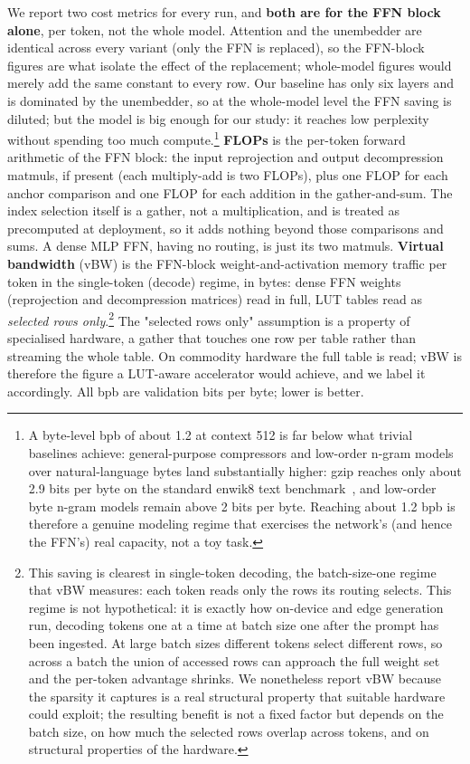 \documentclass[11pt]{article}
\begin{document}
We report two cost metrics for every run, and \textbf{both are for the FFN block alone},
per token, not the whole model. Attention and the unembedder are identical across every
variant (only the FFN is replaced), so the FFN-block figures are what isolate the effect
of the replacement; whole-model figures would merely add the same constant to every row.
Our baseline has only six layers and is dominated by the unembedder, so at the whole-model
level the FFN saving is diluted; but the model is big enough for our study: it reaches low
perplexity without spending too much compute.\footnote{A byte-level bpb of about 1.2 at
context 512 is far below what trivial baselines achieve: general-purpose compressors and
low-order n-gram models over natural-language bytes land substantially higher: gzip
reaches only about 2.9 bits per byte on the standard enwik8 text benchmark~\cite{ltcb}, and
low-order byte n-gram models remain above 2 bits per byte. Reaching about 1.2 bpb is
therefore a genuine modeling regime that exercises the network's (and hence the FFN's)
real capacity, not a toy task.}
\textbf{FLOPs} is the per-token forward arithmetic of the FFN block:
the input reprojection and output decompression matmuls, if present (each multiply-add is two
FLOPs), plus one FLOP for each anchor comparison and one FLOP for each addition in the
gather-and-sum. The index selection itself is a gather, not a multiplication, and is treated as
precomputed at deployment, so it adds nothing beyond those comparisons and sums. A dense MLP FFN,
having no routing, is just its two matmuls.
\textbf{Virtual bandwidth} (vBW) is the FFN-block weight-and-activation memory traffic per
token in the single-token (decode) regime, in bytes: dense FFN weights (reprojection and
decompression matrices) read in full, LUT tables read as \emph{selected rows only}.\footnote{This
saving is clearest in single-token decoding, the batch-size-one regime that vBW measures: each
token reads only the rows its routing selects. This regime is not hypothetical: it is exactly how
on-device and edge generation run, decoding tokens one at a time at batch size one after the prompt
has been ingested. At large batch sizes different tokens select
different rows, so across a batch the union of accessed rows can approach the full weight set and
the per-token advantage shrinks. We nonetheless report vBW because the sparsity it captures is a
real structural property that suitable hardware could exploit; the resulting benefit is not a fixed
factor but depends on the batch size, on how much the selected rows overlap across tokens, and on
structural properties of the hardware.} The
"selected rows only" assumption is a property of specialised hardware, a gather that
touches one row per table rather than streaming the whole table. On commodity hardware the
full table is read; vBW is therefore the figure a LUT-aware accelerator would achieve, and we
label it accordingly. All bpb are validation bits per byte; lower is
better.
\end{document}
